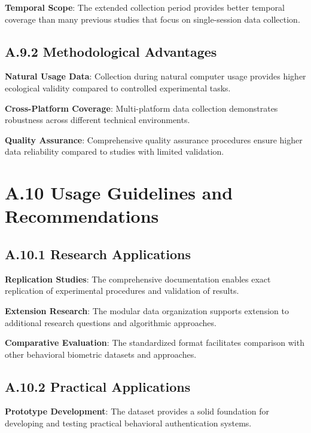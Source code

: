 \documentclass[
  12pt,
  a4paper,
]{report}
\begin{document}
\textbf{Temporal Scope}: The extended collection period provides better
temporal coverage than many previous studies that focus on
single-session data collection.

\subsection{A.9.2 Methodological
Advantages}\label{a.9.2-methodological-advantages}

\textbf{Natural Usage Data}: Collection during natural computer usage
provides higher ecological validity compared to controlled experimental
tasks.

\textbf{Cross-Platform Coverage}: Multi-platform data collection
demonstrates robustness across different technical environments.

\textbf{Quality Assurance}: Comprehensive quality assurance procedures
ensure higher data reliability compared to studies with limited
validation.

\section{A.10 Usage Guidelines and
Recommendations}\label{a.10-usage-guidelines-and-recommendations}

\subsection{A.10.1 Research
Applications}\label{a.10.1-research-applications}

\textbf{Replication Studies}: The comprehensive documentation enables
exact replication of experimental procedures and validation of results.

\textbf{Extension Research}: The modular data organization supports
extension to additional research questions and algorithmic approaches.

\textbf{Comparative Evaluation}: The standardized format facilitates
comparison with other behavioral biometric datasets and approaches.

\subsection{A.10.2 Practical
Applications}\label{a.10.2-practical-applications}

\textbf{Prototype Development}: The dataset provides a solid foundation
for developing and testing practical behavioral authentication systems.
\end{document}
